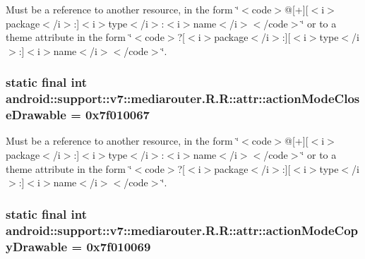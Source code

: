 Must be a reference to another resource, in the form \char`\"{}$<$code$>$@\mbox{[}+\mbox{]}\mbox{[}$<$i$>$package$<$/i$>$:\mbox{]}$<$i$>$type$<$/i$>$:$<$i$>$name$<$/i$>$$<$/code$>$\char`\"{} or to a theme attribute in the form \char`\"{}$<$code$>$?\mbox{[}$<$i$>$package$<$/i$>$:\mbox{]}\mbox{[}$<$i$>$type$<$/i$>$:\mbox{]}$<$i$>$name$<$/i$>$$<$/code$>$\char`\"{}. \hypertarget{classandroid_1_1support_1_1v7_1_1mediarouter_1_1_r_1_1attr_e86318e7c65240271988a55bb2d30bcb}{
\subsubsection[{actionModeCloseDrawable}]{\setlength{\rightskip}{0pt plus 5cm}static final int android::support::v7::mediarouter.R.R::attr::actionModeCloseDrawable = 0x7f010067}}
\label{classandroid_1_1support_1_1v7_1_1mediarouter_1_1_r_1_1attr_e86318e7c65240271988a55bb2d30bcb}


Must be a reference to another resource, in the form \char`\"{}$<$code$>$@\mbox{[}+\mbox{]}\mbox{[}$<$i$>$package$<$/i$>$:\mbox{]}$<$i$>$type$<$/i$>$:$<$i$>$name$<$/i$>$$<$/code$>$\char`\"{} or to a theme attribute in the form \char`\"{}$<$code$>$?\mbox{[}$<$i$>$package$<$/i$>$:\mbox{]}\mbox{[}$<$i$>$type$<$/i$>$:\mbox{]}$<$i$>$name$<$/i$>$$<$/code$>$\char`\"{}. \hypertarget{classandroid_1_1support_1_1v7_1_1mediarouter_1_1_r_1_1attr_5cc39009814a69b9b0e8a27234d53282}{
\subsubsection[{actionModeCopyDrawable}]{\setlength{\rightskip}{0pt plus 5cm}static final int android::support::v7::mediarouter.R.R::attr::actionModeCopyDrawable = 0x7f010069}}
\label{classandroid_1_1support_1_1v7_1_1mediarouter_1_1_r_1_1attr_5cc39009814a69b9b0e8a27234d53282}


